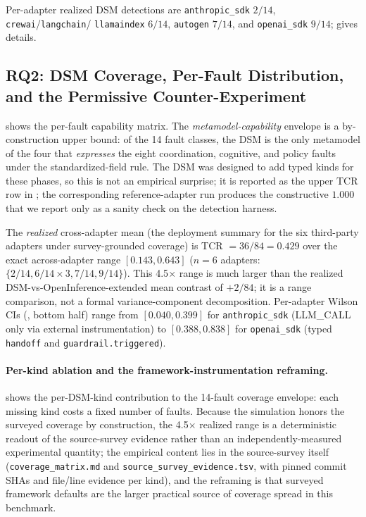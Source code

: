 \documentclass[a4paper,UKenglish,cleveref,autoref,thm-restate]{lipics-v2021}
\begin{document}
\begin{table}[t]
\smallskip
\footnotesize Per-adapter realized DSM detections are
\texttt{anthropic\_sdk} $2/14$, \texttt{crewai}/\texttt{langchain}/
\texttt{llamaindex} $6/14$, \texttt{autogen} $7/14$, and
\texttt{openai\_sdk} $9/14$;  gives details.
\end{table}

\subsection{RQ2: DSM Coverage, Per-Fault Distribution, and the Permissive Counter-Experiment}
\label{sec:rq2-conformance}

 shows the per-fault capability matrix.  The
\emph{metamodel-capability} envelope is a by-construction upper
bound: of the 14 fault classes, the DSM is the only metamodel of the four that
\emph{expresses} the eight coordination, cognitive, and policy faults
under the standardized-field rule.  The DSM was designed to add
typed kinds for these phases, so this is not an empirical surprise; it is
reported as the upper TCR row in ; the corresponding
reference-adapter run produces the constructive $1.000$ that we
report only as a sanity check on the detection harness.

The \emph{realized} cross-adapter mean (the deployment summary for
the six third-party adapters under survey-grounded coverage) is
TCR $= 36/84 = 0.429$ over the exact across-adapter range
$[0.143, 0.643]$ ($n = 6$ adapters: $\{2/14, 6/14 \times 3, 7/14,
9/14\}$). This 4.5$\times$ range is much larger than the realized
DSM-vs-OpenInference-extended mean contrast of $+2/84$; it is a
range comparison, not a formal variance-component decomposition.
Per-adapter Wilson CIs (, bottom
half) range from $[0.040, 0.399]$ for \texttt{anthropic\_sdk}
(LLM\_CALL only via external instrumentation) to $[0.388, 0.838]$
for \texttt{openai\_sdk} (typed \texttt{handoff} and
\texttt{guardrail.triggered}).

\paragraph*{Per-kind ablation and the framework-instrumentation
reframing.}   shows the per-DSM-kind contribution
to the 14-fault coverage envelope: each missing kind costs a fixed
number of faults. Because the simulation honors the surveyed
coverage by construction, the 4.5$\times$ realized range is a
deterministic readout of the source-survey evidence rather than an
independently-measured experimental quantity; the empirical content
lies in the source-survey itself
(\texttt{coverage\_matrix.md} and
\texttt{source\_survey\_evidence.tsv}, with pinned commit SHAs and
file/line evidence per kind), and the reframing is that surveyed
framework defaults are the larger practical source of coverage spread
in this benchmark.
\end{document}
